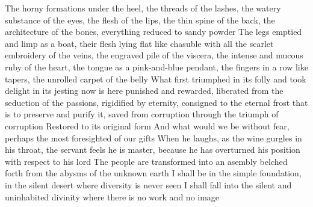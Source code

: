 \documentclass{article}
\begin{document}
The horny formations under the heel, the threads of the lashes, the watery substance of the eyes, the flesh of the lips, the thin spine of the back, the architecture of the bones, everything reduced to sandy powder
The legs emptied and limp as a boat, their flesh lying flat like chasuble with all the scarlet embroidery of the veins, the engraved pile of the viscera, the intense and mucous ruby of the heart, the tongue as a pink-and-blue pendant, the fingers in a row like tapers, the unrolled carpet of the belly
What first triumphed in its folly and took delight in its jesting now is here punished and rewarded, liberated from the seduction of the passions, rigidified by eternity, consigned to the eternal frost that is to preserve and purify it, saved from corruption through the triumph of corruption
Restored to its original form
And what would we be without fear, perhaps the most foresighted of our gifts
When he laughs, as the wine gurgles in his throat, the servant feels he is master, because he has overturned his position with respect to his lord
The people are transformed into an asembly belched forth from the abysms of the unknown earth
I shall be in the simple foundation, in the silent desert where diversity is never seen
I shall fall into the silent and uninhabited divinity where there is no work and no image
\fi
\end{document}
